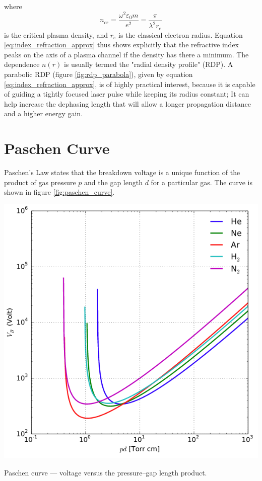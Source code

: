 \documentclass[justified,nofonts,nobib]{tufte-book}
\begin{document}
where
\begin{equation}
n_{cr}=\frac{\omega^2 \varepsilon_0 m}{e^2}=\frac{\pi}{\lambda^2 r_e} \label{eq:critical_density}
\end{equation}
is the critical plasma density, and $r_e$ is the classical electron radius. Equation \ref{eq:index_refraction_approx} thus shows explicitly that the refractive index peaks on the axis of a plasma channel if the density has there a minimum. 
The dependence $n(r)$ is usually termed the "radial density profile" (RDP). A parabolic RDP (figure \ref{fig:rdp_parabola}), given by equation \ref{eq:index_refraction_approx}, is of highly practical interest, because it is capable \cite{Sprangle1992PropagationPlasmas,Sprangle1992PropagationPlasmas} of guiding a tightly focused laser pulse while keeping its radius constant; It can help increase the dephasing length that will allow a longer propagation distance and a higher energy gain. 

\section{Paschen Curve}\label{sec:paschen}
Paschen's Law states that the breakdown voltage is a unique function of the product of gas pressure $p$ and the gap length $d$ for a particular gas. The curve is shown in figure \ref{fig:paschen_curve}.
\begin{marginfigure}
    \includegraphics[width=\marginparwidth]{figures/paschen_curve.PNG}
    \label{fig:paschen_curve}
    \caption{Paschen curve --- voltage versus the pressure--gap length product.}
\end{marginfigure}
\end{document}
